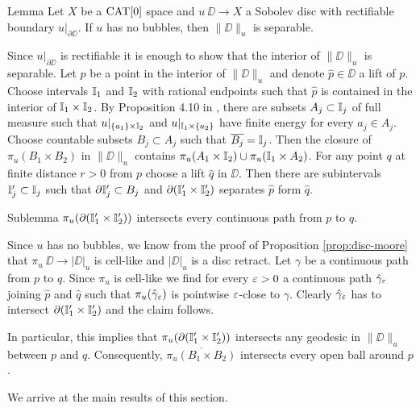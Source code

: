 \documentclass{article}
\begin{document}
\begin{thm}{Lemma}\label{lem:separable}
Let $X$ be a $\mathop{\rm CAT}\nolimits[0]$ space 
and $u\:\DD\to X$ a Sobolev disc with rectifiable boundary $u|_{\partial \DD}$.
If $u$ has no bubbles, then $\|\DD\|_u$ is separable.
\end{thm}

Since $u|_{\partial \DD}$ is rectifiable it is enough to show that 
the interior of $\|\DD\|_u$ is separable. Let $p$ be a point in the interior of $\|\DD\|_u$ and denote $\hat p\in\DD$ 
a lift of $p$. 
Choose intervals $\mathbb{I}_1$ and $\mathbb{I}_2$ with rational endpoints such that $\hat p$ is contained in the interior of $\mathbb{I}_1\times \mathbb{I}_2$.
By Proposition 4.10 in \cite{LW}, there are subsets $A_j\subset \mathbb{I}_j$ of full measure such that $u|_{\{a_1\}\times \mathbb{I}_2}$
and $u|_{\mathbb{I}_1\times \{a_2\}}$ have finite energy for every $a_j\in A_j$. Choose countable subsets $B_j\subset A_j$
such that $\overline{B_j}=\mathbb{I}_j$. Then the closure of $\pi_u(B_1\times B_2)$ in $\|\DD\|_u$ contains 
$\pi_u(A_1\times \mathbb{I}_2)\cup \pi_u(\mathbb{I}_1\times A_2)$.
For any point $q$ at finite distance $r>0$ from $p$ choose a lift $\hat q$ in $\DD$. 
Then there are subintervals $\mathbb{I}'_j\subset \mathbb{I}_j$
such that $\partial \mathbb{I}'_j\subset B_j$ and $\partial( \mathbb{I}'_1\times \mathbb{I}'_2)$ separates $\hat p$ form $\hat q$.
\begin{thm}{Sublemma}\label{sublem:separating}
$\pi_u(\partial( \mathbb{I}'_1\times \mathbb{I}'_2))$ intersects every continuous path from $p$ to $q$.
\end{thm}

Since $u$ has no bubbles, we know from the proof of Proposition \ref{prop:disc-moore} that $\pi_u\:\DD\to|\DD|_u$ is cell-like and 
$|\DD|_u$ is a disc retract. 
Let $\gamma$ be a continuous path from $p$ to $q$. Since $\pi_u$ is cell-like we find for every $\varepsilon>0$ a continuous path $\hat\gamma_\varepsilon$ joining $\hat p$
and $\hat q$ such that $\pi_u(\hat\gamma_\varepsilon)$ is pointwise $\varepsilon$-close to $\gamma$. Clearly $\hat\gamma_\varepsilon$ has to intersect 
$\partial( \mathbb{I}'_1\times \mathbb{I}'_2)$ and the claim follows.
\qeds

In particular, this implies that $\pi_u(\partial( \mathbb{I}'_1\times \mathbb{I}'_2))$ intersects any geodesic in $\|\DD\|_u$ between $p$ and $q$. 
Consequently, $\overline{\pi_u(B_1\times B_2)}$ intersects every open ball around $p$.
\qeds





We arrive at the main results of this section.
\end{document}
